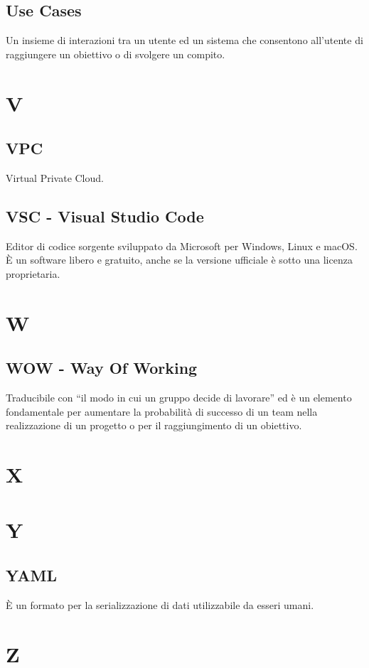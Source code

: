 \documentclass{classes/base}
\begin{document}
        \subsection*{Use Cases} 
        Un insieme di interazioni tra un utente ed un sistema che consentono all'utente di raggiungere un obiettivo o di svolgere un compito.
        
        \newpage  
    \section{V}

        \subsection*{VPC}
        Virtual Private Cloud.
        
        \subsection*{VSC - Visual Studio Code}
        Editor di codice sorgente sviluppato da Microsoft per Windows, Linux e macOS. È un software libero e gratuito, anche se la versione ufficiale è sotto una licenza proprietaria.
        
        \newpage  
    \section{W}
        \subsection*{WOW - Way Of Working}
        Traducibile con “il modo in cui un gruppo decide di lavorare” ed è un elemento fondamentale per aumentare la probabilità di successo di un team nella realizzazione di un progetto o per il raggiungimento di un obiettivo.  
        \newpage  
    \section{X}
    \newpage  
    \section{Y}
        \subsection*{YAML}
        È un formato per la serializzazione di dati utilizzabile da esseri umani.
        
        \newpage  
    \section{Z}
\end{document}
